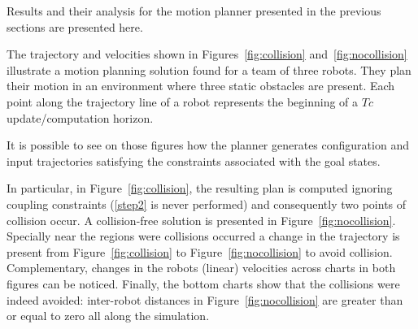 Results and their analysis for the motion planner presented in the previous sections are 
presented here.

The trajectory and velocities shown in Figures~\ref{fig:collision} and~\ref{fig:nocollision}
illustrate a motion planning solution found for a team of three robots.
They plan their motion in an environment where three static obstacles are present.
Each point along the trajectory line of a robot represents the beginning
of a $Tc$ update/computation horizon.

It is possible to see on those figures how the planner generates configuration and 
input trajectories satisfying the constraints associated with the goal states.

In particular, in Figure~\ref{fig:collision}, the resulting plan is computed ignoring 
coupling constraints (\ref{step2} is never performed) and consequently two points of collision occur.
A collision-free solution is presented in Figure~\ref{fig:nocollision}.
Specially near the regions were collisions occurred a change in the trajectory is present from Figure~\ref{fig:collision} to Figure~\ref{fig:nocollision} to avoid collision. 
Complementary, changes 
in the robots (linear) velocities across charts in both figures can be noticed. Finally, the 
bottom charts show that the collisions were indeed avoided: inter-robot distances in 
Figure~\ref{fig:nocollision} are greater than or equal to zero all along the 
simulation.



